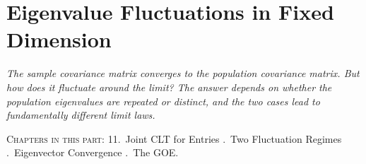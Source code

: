 \part{Eigenvalue Fluctuations in Fixed Dimension}

\begin{fullwidth}
\noindent\textit{The sample covariance matrix converges to the population covariance matrix. But \emph{how} does it fluctuate around the limit? The answer depends on whether the population eigenvalues are repeated or distinct, and the two cases lead to fundamentally different limit laws.}

\medskip
\noindent\textsc{Chapters in this part:} 11.~Joint CLT for Entries .~Two Fluctuation Regimes .~Eigenvector Convergence .~The GOE.
\end{fullwidth}
